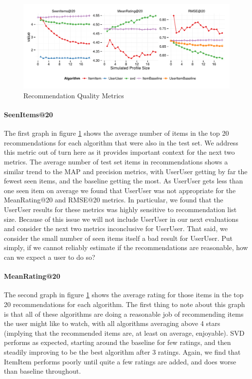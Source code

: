 \documentclass[letterpaper]{sig-alternate}
\begin{document}

\begin{figure}[ht!]
  \centering
  \includegraphics[width=\linewidth]{../lenskit/output/ekstrandTuned20/rmse_20.pdf}
  \caption{Recommendation Quality Metrics}
  \label{fig:topN.rmse}
\end{figure}

  \paragraph{SeenItems@20}
  The first graph in figure \ref{fig:topN.rmse} shows the average number of items in the top 20 recommendations for each algorithm that were also in the test set.
  We address this metric out of turn here as it provides important context for the next two metrics.
  The average number of test set items in recommendations shows a similar trend to the MAP and precision metrics, with UserUser getting by far the fewest seen items, and the baseline getting the most.
  As UserUser gets less than one seen item on average we found that UserUser was not appropriate for the MeanRating@20 and RMSE@20 metrics.
  In particular, we found that the UserUser results for these metrics was highly sensitive to recommendation list size.
  Because of this issue we will not include UserUser in our next evaluations and consider the next two metrics inconclusive for UserUser.
  That said, we consider the small number of seen items itself a bad result for UserUser.
  Put simply, if we cannot reliably estimate if the recommendations are reasonable, how can we expect a user to do so?

  \paragraph{MeanRating@20}
  The second graph in figure \ref{fig:topN.rmse} shows the average rating for those items in the top 20 recommendations for each algorithm.
  The first thing to note about this graph is that all of these algorithms are doing a reasonable job of recommending items the user might like to watch, with all algorithms averaging above 4 stars (implying that the recommended items are, at least on average, enjoyable).
  SVD performs as expected, starting around the baseline for few ratings, and then steadily improving to be the best algorithm after 3 ratings.
  Again, we find that ItemItem performs poorly until quite a few ratings are added, and does worse than baseline throughout.
    
\end{document}
